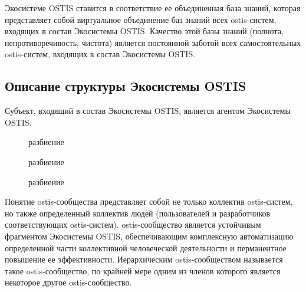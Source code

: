 Экосистеме OSTIS ставится в соответствие ее объединенная база знаний, которая представляет собой виртуальное объединение баз знаний всех ostis-систем, входящих в состав Экосистемы OSTIS. 
Качество этой базы знаний (полнота, непротиворечивость, чистота) является постоянной заботой всех самостоятельных ostis-систем, входящих в состав Экосистемы OSTIS.


\subsection{Описание структуры Экосистемы OSTIS}
{\label{sec_ecosystem_structure_description}} 

Субъект, входящий в состав Экосистемы OSTIS, является агентом Экосистемы OSTIS.

\begin{figure}[htbp]
\begin{SCn}
\begin{scnrelfromset}{разбиение}
	\begin{scnindent}
    \begin{scnrelfromset}{разбиение}
    \end{scnrelfromset}
	\end{scnindent}
	\begin{scnindent}
    \begin{scnrelfromset}{разбиение}
    \end{scnrelfromset}
	\end{scnindent}
\end{scnrelfromset}
\end{SCn}
\end{figure}

Понятие ostis-сообщества представляет собой не только коллектив ostis-систем, но также определенный коллектив людей (пользователей и разработчиков соответствующих ostis-систем). 
ostis-сообщество является устойчивым фрагментом Экосистемы OSTIS, обеспечивающим комплексную автоматизацию определенной части коллективной человеческой деятельности и перманентное повышение ее эффективности. 
Иерархическим ostis-сообществом называется такое ostis-сообщество, по крайней мере одним из членов которого является некоторое другое ostis-сообщество.

